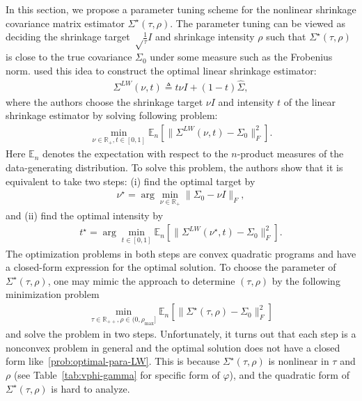 \documentclass[11pt]{article}
\def\R{\mathbb{R}}
\newcommand{\opt}{^\star}
\newcommand{\Let}{\triangleq}
\def\R{\mathbb{R}}
\def\E {\mathbb{E}}
\newcommand{\wh}{\widehat}
\begin{document}
In this section, we propose a parameter tuning scheme for the nonlinear shrinkage covariance matrix estimator $\Sigma\opt(\tau, \rho)$. The parameter tuning can be viewed as deciding the shrinkage target $\sqrt\frac{1}{\tau} I$ and shrinkage intensity $ \rho$ such that $\Sigma\opt(\tau, \rho)$ is close to the true covariance $\Sigma_0$ under some measure such as the Frobenius norm. \cite{ref:LEDOIT2004365} used this idea to construct the optimal linear shrinkage estimator:
\begin{align*}
\Sigma^{LW}(\nu, t)\Let t\nu I + (1- t) \wh\Sigma, 
\end{align*}
where the authors choose the shrinkage target $\nu I$ and intensity $ t$ of the linear shrinkage estimator by solving following problem:
\begin{align}\label{prob:optimal-para-LW}
    \min_{\nu \in \R_+,  t \in [0,1]}\E_n[\|\Sigma^{LW}(\nu, t)-\Sigma_0\|_F^2].
\end{align}
Here $\E_n$ denotes the expectation with respect to the $n$-product measures of the data-generating distribution.
To solve this problem, the authors show that it is equivalent to take two steps: (i) find the optimal target by 
\begin{align}
    \nu\opt=\arg\min_{\nu\in\R_+}\|\Sigma_0-\nu I\|_F,
\end{align}
and (ii) find the optimal intensity by 
\begin{align}
     t\opt=\arg\min_{ t\in[0,1]}\E_n[\|\Sigma^{LW}(\nu\opt, t)-\Sigma_0\|_F^2].
\end{align}
The optimization problems in both steps are convex quadratic programs and have a closed-form expression for the optimal solution. 
To choose the parameter of $\Sigma\opt(\tau,\rho)$, one may mimic the approach to determine $(\tau,\rho)$ by the following minimization problem
\begin{align}
\min_{\tau\in\R_{++}, \rho\in(0, \rho_{\max}]} \E_n[\|\Sigma\opt(\tau, \rho)-\Sigma_0\|_F^2]
\end{align}
and solve the problem in two steps.
Unfortunately, it turns out that each step is a nonconvex problem in general and the optimal solution does not have a closed form  like~\eqref{prob:optimal-para-LW}. 
This is because $\Sigma\opt(\tau, \rho)$ is nonlinear 
in $\tau$ and $ \rho$ (see Table~\ref{tab:vphi-gamma} for specific form of $\varphi$), and the quadratic form of $\Sigma\opt(\tau, \rho)$ is hard to analyze. 
\end{document}
